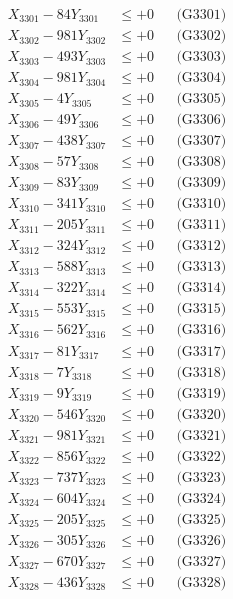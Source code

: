 \documentclass[a4paper,10pt]{article}
\begin{document}
{\begin{align}
\allowbreak
X_{3301} - 84Y_{3301} &\leq +0 && \text{(G3301)} \\
X_{3302} - 981Y_{3302} &\leq +0 && \text{(G3302)} \\
X_{3303} - 493Y_{3303} &\leq +0 && \text{(G3303)} \\
X_{3304} - 981Y_{3304} &\leq +0 && \text{(G3304)} \\
X_{3305} - 4Y_{3305} &\leq +0 && \text{(G3305)} \\
X_{3306} - 49Y_{3306} &\leq +0 && \text{(G3306)} \\
X_{3307} - 438Y_{3307} &\leq +0 && \text{(G3307)} \\
X_{3308} - 57Y_{3308} &\leq +0 && \text{(G3308)} \\
X_{3309} - 83Y_{3309} &\leq +0 && \text{(G3309)} \\
X_{3310} - 341Y_{3310} &\leq +0 && \text{(G3310)} \\
\allowbreak
X_{3311} - 205Y_{3311} &\leq +0 && \text{(G3311)} \\
X_{3312} - 324Y_{3312} &\leq +0 && \text{(G3312)} \\
X_{3313} - 588Y_{3313} &\leq +0 && \text{(G3313)} \\
X_{3314} - 322Y_{3314} &\leq +0 && \text{(G3314)} \\
X_{3315} - 553Y_{3315} &\leq +0 && \text{(G3315)} \\
X_{3316} - 562Y_{3316} &\leq +0 && \text{(G3316)} \\
X_{3317} - 81Y_{3317} &\leq +0 && \text{(G3317)} \\
X_{3318} - 7Y_{3318} &\leq +0 && \text{(G3318)} \\
X_{3319} - 9Y_{3319} &\leq +0 && \text{(G3319)} \\
X_{3320} - 546Y_{3320} &\leq +0 && \text{(G3320)} \\
\allowbreak
X_{3321} - 981Y_{3321} &\leq +0 && \text{(G3321)} \\
X_{3322} - 856Y_{3322} &\leq +0 && \text{(G3322)} \\
X_{3323} - 737Y_{3323} &\leq +0 && \text{(G3323)} \\
X_{3324} - 604Y_{3324} &\leq +0 && \text{(G3324)} \\
X_{3325} - 205Y_{3325} &\leq +0 && \text{(G3325)} \\
X_{3326} - 305Y_{3326} &\leq +0 && \text{(G3326)} \\
X_{3327} - 670Y_{3327} &\leq +0 && \text{(G3327)} \\
X_{3328} - 436Y_{3328} &\leq +0 && \text{(G3328)} \\

\end{align}}
\end{document}
